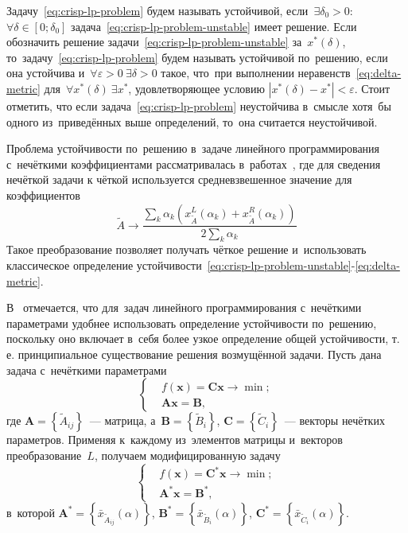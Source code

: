 Задачу~\eqref{eq:crisp-lp-problem} будем называть устойчивой, если~$\exists \delta_0 > 0$: $\forall \delta \in \left[ 0; \delta_0 \right]$  задача~\eqref{eq:crisp-lp-problem-unstable} имеет решение. Если обозначить решение задачи~\eqref{eq:crisp-lp-problem-unstable} за~$x^{*} \left(\delta \right)$, то~задачу~\eqref{eq:crisp-lp-problem} будем называть устойчивой по~решению, если она устойчива и~$\forall \varepsilon>0\ \exists \delta > 0$ такое, что~при выполнении неравенств~\eqref{eq:delta-metric} для~$\forall x^{*} \left(\delta \right)\ \exists x^{*}$, удовлетворяющее условию $\left| x^{*}\left(\delta \right)- x^{*} \right| < \varepsilon$. Стоит отметить, что если задача~\eqref{eq:crisp-lp-problem} неустойчива в~смысле хотя~бы одного из~приведённых выше определений, то~она считается неустойчивой.

Проблема устойчивости по~решению в~задаче линейного программирования с~нечёткими коэффициентами рассматривалась в~работах~\cite{Matveev_Starodubtsev, PhD_Starodubtsev}, где для сведения нечёткой задачи к чёткой используется средневзвешенное значение для коэффициентов
\begin{equation*}
  \tilde A \to \frac{\sum \limits_k \alpha_k \left( x^L_{\tilde A} \left( \alpha_k \right) + x^R_{\tilde A} \left( \alpha_k \right) \right) }{2 \sum \limits_k \alpha_k }
\end{equation*}
Такое преобразование позволяет получать чёткое решение и~использовать классическое определение устойчивости~\eqref{eq:crisp-lp-problem-unstable}-\eqref{eq:delta-metric}.

В~\cite{Vorontsov_VSTU} отмечается, что для~задач линейного программирования с~нечёткими параметрами удобнее использовать определение устойчивости по~решению, поскольку оно включает в~себя более узкое определение общей устойчивости, т.\,е. принципиальное существование решения возмущённой задачи. Пусть дана задача с~нечёткими параметрами
\begin{equation*}
  \left\{ \begin{aligned}
    & f\left( \mathbf{x} \right)=\mathbf{Cx}\to \min;  \\ 
    & \mathbf{Ax}=\mathbf{B},
  \end{aligned} \right.
\end{equation*}
где $\mathbf{A}=\left\{ \tilde{A}_{ij} \right\}$~--- матрица, а~$\mathbf{B}=\left\{ \tilde{B}_i \right\}$, $\mathbf{C}=\left\{\tilde{C}_i \right\}$~--- векторы нечётких параметров. Применяя к~каждому из~элементов матрицы и~векторов преобразование~$L$, получаем модифицированную задачу
\begin{equation}
\label{eq:fuzzy-lp-unstable-problem}
  \left\{ \begin{aligned}
    & f\left( \mathbf{x} \right)={\mathbf{C}^{*}}\mathbf{x}\to \min;  \\ 
    & {\mathbf{A}^{*}}\mathbf{x}={\mathbf{B}}^{*},
  \end{aligned} \right.
\end{equation}
в~которой $\mathbf{A}^{*}=\left\{ \bar{x}_{\tilde{A}_{ij}}\left(\alpha \right) \right\}$, $\mathbf{B}^{*}=\left\{ \bar{x}_{\tilde{B}_i}\left(\alpha \right) \right\}$, $\mathbf{C}^{*}=\left\{ \bar{x}_{\tilde{C}_i}\left(\alpha \right) \right\}$.

